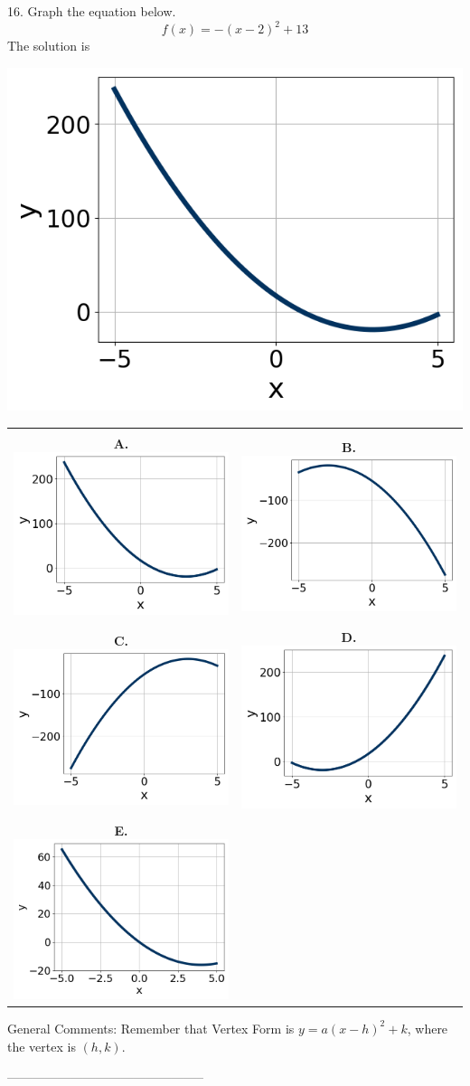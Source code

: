 16. Graph the equation below.
$$ f(x) = -(x-2)^2 + 13 $$ 
The solution is  
 \begin{center} \includegraphics[width=0.5	extwidth]{../Figures/quadraticEquationToGraphAA.png} \end{center}\begin{tabular}{|c|c|} 
\hline 
 & \\ 
\textbf{A.} \includegraphics[width=0.5	extwidth]{../Figures/quadraticEquationToGraphAA.png} & \textbf{B.} \includegraphics[width=0.5	extwidth]{../Figures/quadraticEquationToGraphBA.png} \\ 
\hline 
 & \\ 
\textbf{C.} \includegraphics[width=0.5	extwidth]{../Figures/quadraticEquationToGraphCA.png} & \textbf{D.} \includegraphics[width=0.5	extwidth]{../Figures/quadraticEquationToGraphDA.png} \\ 
\hline 
 & \\ 
 \textbf{E.} \includegraphics[width=0.5	extwidth]{../Figures/quadraticEquationToGraphEA.png} & \\ 
\hline 
 \end{tabular} 
 
General Comments: Remember that Vertex Form is $y = a(x-h)^2+k$, where the vertex is $(h, k)$.

-----------------------------------------------

